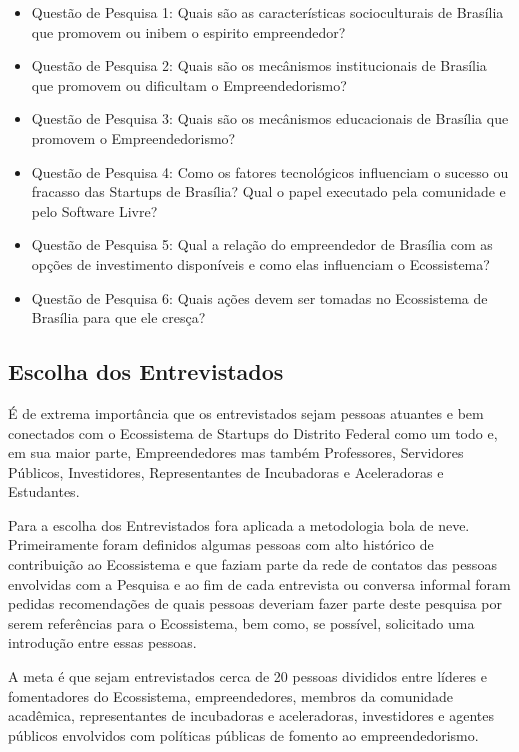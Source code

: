 \begin{itemize}
  \item Questão de Pesquisa 1: Quais são as características socioculturais de Brasília que promovem ou inibem o espirito empreendedor?
  \item Questão de Pesquisa 2: Quais são os mecânismos institucionais de Brasília que promovem ou dificultam o Empreendedorismo?
  \item Questão de Pesquisa 3: Quais são os mecânismos educacionais de Brasília que promovem o Empreendedorismo?
  \item Questão de Pesquisa 4: Como os fatores tecnológicos influenciam o sucesso ou fracasso das Startups de Brasília? Qual o papel executado pela comunidade e pelo Software Livre?
  \item Questão de Pesquisa 5: Qual a relação do empreendedor de Brasília com as opções de investimento disponíveis e como elas influenciam o Ecossistema?
  \item Questão de Pesquisa 6: Quais ações devem ser tomadas no Ecossistema de Brasília para que ele cresça?
\end{itemize}

\subsection{Escolha dos Entrevistados}
\label{subsection:escolha_dos_entrevistados}

É de extrema importância que os entrevistados sejam pessoas atuantes e bem conectados com o Ecossistema de Startups do Distrito Federal como um todo e, em sua maior parte, Empreendedores mas também Professores, Servidores Públicos, Investidores, Representantes de Incubadoras e Aceleradoras e Estudantes. 

Para a escolha dos Entrevistados fora aplicada a metodologia bola de neve. Primeiramente foram definidos algumas pessoas com alto histórico de contribuição ao Ecossistema e que faziam parte da rede de contatos das pessoas envolvidas com a Pesquisa e ao fim de cada entrevista ou conversa informal foram pedidas recomendações de quais pessoas deveriam fazer parte deste pesquisa por serem referências para o Ecossistema, bem como, se possível, solicitado uma introdução entre essas pessoas. 

A meta é que sejam entrevistados cerca de 20 pessoas divididos entre líderes e fomentadores do Ecossistema, empreendedores, membros da comunidade acadêmica, representantes de incubadoras e aceleradoras, investidores e agentes públicos envolvidos com políticas públicas de fomento ao empreendedorismo. 

